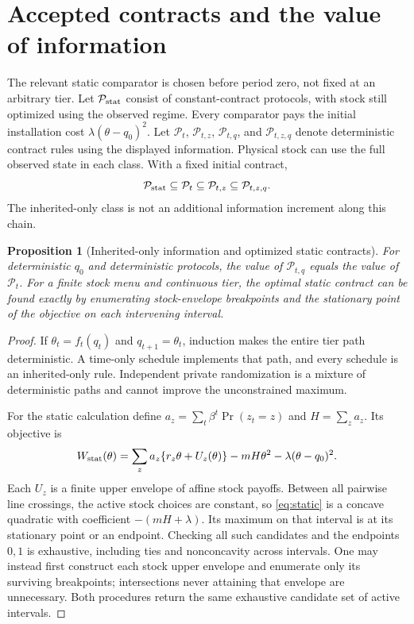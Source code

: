 \documentclass[11pt,letterpaper]{article}
\newtheorem{proposition}[theorem]{Proposition}
\theoremstyle{definition}
\newcommand{\1}{\mathbf 1}
\begin{document}
\section{Accepted contracts and the value of information}\label{sec:accepted}
The relevant static comparator is chosen before period zero, not fixed at an arbitrary tier. Let $\mathcal P_{\rm stat}$ consist of constant-contract protocols, with stock still optimized using the observed regime. Every comparator pays the initial installation cost $\lambda(\theta-q_0)^2$. Let $\mathcal P_t$, $\mathcal P_{t,z}$, $\mathcal P_{t,q}$, and $\mathcal P_{t,z,q}$ denote deterministic contract rules using the displayed information. Physical stock can use the full observed state in each class. With a fixed initial contract,
\begin{equation}\label{eq:classes}
 \mathcal P_{\rm stat}\subseteq\mathcal P_t
 \subseteq\mathcal P_{t,z}\subseteq\mathcal P_{t,z,q}.
\end{equation}
The inherited-only class is not an additional information increment along this chain.
\begin{proposition}[Inherited-only information and optimized static contracts]\label{prop:classes}
For deterministic $q_0$ and deterministic protocols, the value of $\mathcal P_{t,q}$ equals the value of $\mathcal P_t$. For a finite stock menu and continuous tier, the optimal static contract can be found exactly by enumerating stock-envelope breakpoints and the stationary point of the objective on each intervening interval.
\end{proposition}
\begin{proof}
If $\theta_t=f_t(q_t)$ and $q_{t+1}=\theta_t$, induction makes the entire tier path deterministic. A time-only schedule implements that path, and every schedule is an inherited-only rule. Independent private randomization is a mixture of deterministic paths and cannot improve the unconstrained maximum.

For the static calculation define $a_z=\sum_t\beta^t\Pr(z_t=z)$ and $H=\sum_z a_z$. Its objective is
\begin{equation}\label{eq:static}
 W_{\rm stat}(\theta)=\sum_z a_z\{r_z\theta+U_z(\theta)\}
             -mH\theta^2-\lambda(\theta-q_0)^2.
\end{equation}
Each $U_z$ is a finite upper envelope of affine stock payoffs. Between all pairwise line crossings, the active stock choices are constant, so \eqref{eq:static} is a concave quadratic with coefficient $-(mH+\lambda)$. Its maximum on that interval is at its stationary point or an endpoint. Checking all such candidates and the endpoints $0,1$ is exhaustive, including ties and nonconcavity across intervals. One may instead first construct each stock upper envelope and enumerate only its surviving breakpoints; intersections never attaining that envelope are unnecessary. Both procedures return the same exhaustive candidate set of active intervals.\end{proof}
\end{document}
